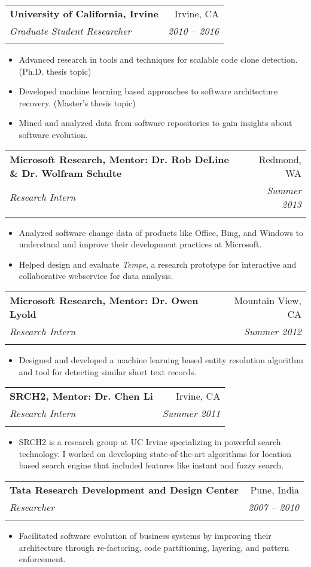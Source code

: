 \documentclass[letterpaper,11pt]{article}
\makeatletter
\newcommand{\resumeItem}[2]{
  \item\small{
    \textbf{#1}{ #2 \vspace{-3pt}}
  }
}
\newcommand{\resumeSubheading}[5]{
  \vspace{-3pt}\item
    \begin{tabular*}{0.97\textwidth}[t]{l@{\extracolsep{\fill}}r}
      \textbf{#1} & #2 \\
      \textit{\small#3} & \textit{\small #4} \\
      \textit{\small#5}  
    \end{tabular*}\vspace{-12pt}
}
\newcommand{\resumeItemListStart}{\begin{itemize}}
\newcommand{\resumeItemListEnd}{\end{itemize}\vspace{-7pt}}
\makeatother
\begin{document}
     \resumeSubheading
      {University of California, Irvine}{Irvine, CA}
      {Graduate Student Researcher}{2010 -- 2016}
     {}
     \vspace{-15pt}
      \resumeItemListStart
        \resumeItem{}
          {Advanced research in tools and techniques for scalable code clone detection. (Ph.D. thesis topic)}
        \resumeItem{}
          {Developed machine learning based approaches to software architecture recovery. (Master’s thesis topic)}
        \resumeItem{}
          {Mined and analyzed data from software repositories to gain insights about software evolution.}
       \resumeItemListEnd

\vspace{5pt}
    \resumeSubheading
      {Microsoft Research, Mentor: Dr. Rob DeLine \& Dr. Wolfram Schulte}{Redmond, WA}
      {Research Intern}{Summer 2013}
     {}
     \vspace{-15pt}
      \resumeItemListStart
        \resumeItem {} {Analyzed software change data of products like Office, Bing, and Windows to understand and
improve their development practices at Microsoft.}
        \resumeItem {} {Helped design and evaluate \emph{Tempe}, a research prototype for interactive and collaborative webservice for data analysis.}
      \resumeItemListEnd

\vspace{5pt}
    \resumeSubheading
      {Microsoft Research, Mentor: Dr. Owen Lyold}{Mountain View, CA}
      {Research Intern}{Summer 2012}
     {}
     \vspace{-15pt}
      \resumeItemListStart
        \resumeItem {} {Designed and developed a machine learning based entity resolution algorithm and tool for detecting similar short text records.}
\resumeItemListEnd
 
\vspace{5pt}
  \resumeSubheading
      {SRCH2, Mentor: Dr. Chen Li}{Irvine, CA}
      {Research Intern}{Summer 2011}
     {}
     \vspace{-15pt}
      \resumeItemListStart
        \resumeItem {} {SRCH2 is a research group at UC Irvine specializing in powerful search technology. I worked on developing state-of-the-art algorithms for location based search engine that included features like instant and fuzzy search.}
\resumeItemListEnd

\vspace{5pt}
  \resumeSubheading
      {Tata Research Development and Design Center}{Pune, India}
      {Researcher}{2007 -- 2010}
      {}
     \vspace{-15pt}
      \resumeItemListStart
        \resumeItem {} {Facilitated software evolution of business systems by improving their architecture through re-factoring, code partitioning, layering, and pattern enforcement.}
      \resumeItemListEnd
\end{document}

